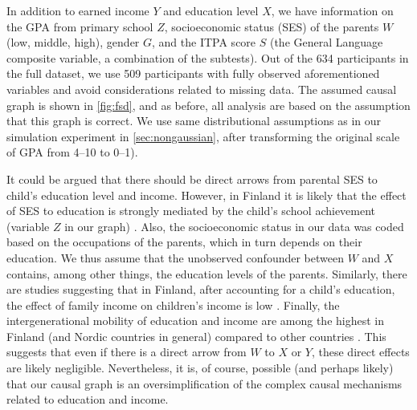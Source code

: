 \documentclass[11pt,a4paper,twoside]{article}
\newcommand{\+}[1]{\ensuremath{\mathbf{#1}}}
\begin{document}
	In addition to earned income $Y$ and education level $X$, we have information on the GPA from primary school $Z$, socioeconomic status (SES) of the parents $W$ (low, middle, high), gender $G$, and the ITPA score $S$ (the General Language composite variable, a combination of the subtests). Out of the 634 participants in the full dataset, we use 509 participants with fully observed aforementioned variables and avoid considerations related to missing data. The assumed causal graph is shown in \autoref{fig:fsd}, and as before, all analysis are based on the assumption that this graph is correct. We use same distributional assumptions as in our simulation experiment in \autoref{sec:nongaussian}, after transforming the original scale of GPA from 4--10 to 0--1).
		
	It could be argued that there should be direct arrows from parental SES to child's education level and income. However, in Finland it is likely that the effect of SES to education is strongly mediated by the child's school achievement (variable $Z$ in our graph) \citep{Acacio-Claro}. Also, the socioeconomic status in our data was coded based on the occupations of the parents, which in turn depends on their education. We thus assume that the unobserved confounder between $W$ and $X$ contains, among other things, the education levels of the parents. Similarly, there are studies suggesting that in Finland, after accounting for a child's education, the effect of family income on children's income is low \citep{Osterbacka}. Finally, the intergenerational mobility of education and income are among the highest in Finland (and Nordic countries in general) compared to other countries \citep{Pfeffer, bjorklund}. This suggests that even if there is a direct arrow from $W$ to $X$ or $Y$, these direct effects are likely negligible. Nevertheless, it is, of course, possible (and perhaps likely) that our causal graph is an oversimplification of the complex causal mechanisms related to education and income.
	
\end{document}
